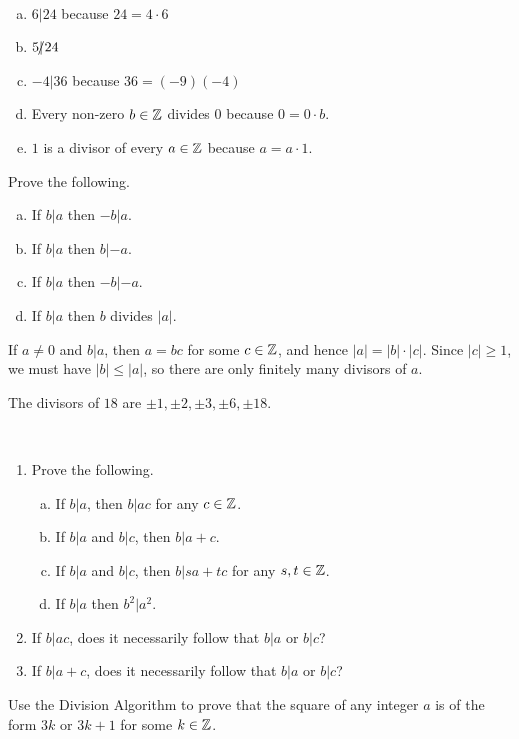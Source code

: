 \documentclass[11pt,fleqn,dvipsnames,usenames]{article}
\begin{document}
\begin{examples}~
\begin{enumerate}[(a)]
\item $6 | 24$ because $24 = 4\cdot 6$
\item $5|\kern-0.9ex{/} 24$
\item $-4 | 36$ because $36 = (-9)(-4)$
\item Every non-zero $b\in\mathbb{Z}$ divides $0$ because $0 = 0\cdot b$.
\item $1$ is a divisor of every $a\in\mathbb{Z}$ because $a = a\cdot 1$.
\end{enumerate}
\end{examples}
%
\begin{exercise} Prove the following.
\begin{enumerate}[(a)]
\item If $b|a$ then $-b|a$.
\item If $b|a$ then $b|-a$.
\item If $b|a$ then $-b|-a$.
\item If $b|a$ then $b$ divides $|a|$.
\end{enumerate}
\end{exercise}

\begin{remark}
If $a\neq 0$ and $b|a$, then $a = bc$ for some $c\in\mathbb{Z}$, and hence $|a| = |b|\cdot |c|$.  Since $|c|\geq 1$, we must have $|b|\leq |a|$, so there are only finitely many divisors of $a$.
\end{remark}

\begin{example}
The divisors of $18$ are $\pm1, \pm2,\pm3,\pm6,\pm18$.
\end{example}

\begin{exercises}\label{divisibilityproperties}~
\begin{enumerate}
\item Prove the following.
\begin{enumerate}[(a)]
\item If $b|a$, then $b|ac$ for any $c\in\mathbb{Z}$.
\item If $b|a$ and $b|c$, then $b|a+c$.
\item If $b|a$ and $b|c$, then $b|sa+tc$ for any $s,t\in\mathbb{Z}$.
\item If $b|a$ then $b^2|a^2$.
\end{enumerate}
\item If $b|ac$, does it necessarily follow that $b|a$ or $b|c$?
\item If $b|a+c$, does it necessarily follow that $b|a$ or $b|c$? 
\end{enumerate}
\end{exercises}
%
\begin{example}
Use the Division Algorithm to prove that the square of any integer $a$ is of the form $3k$ or $3k+1$ for some $k\in\mathbb{Z}$.
\end{example}
\end{document}
